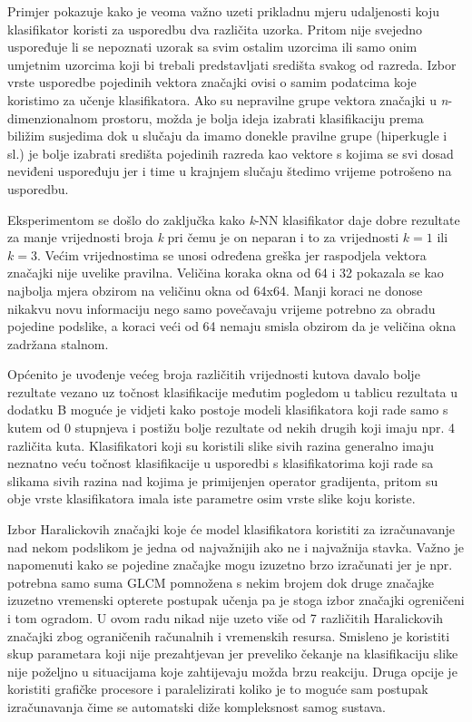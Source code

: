 \documentclass[times, utf8, zavrsni]{fer}
\begin{document}
\bigbreak

Primjer pokazuje kako je veoma važno uzeti prikladnu mjeru udaljenosti koju klasifikator koristi
za usporedbu dva različita uzorka. Pritom nije svejedno uspoređuje li se nepoznati 
uzorak sa svim ostalim uzorcima ili samo onim umjetnim uzorcima koji bi trebali
predstavljati središta svakog od razreda. Izbor vrste usporedbe pojedinih vektora
značajki ovisi o samim podatcima koje koristimo za učenje klasifikatora. Ako su nepravilne
grupe vektora značajki u \textit{n}-dimenzionalnom prostoru, možda je bolja ideja izabrati
klasifikaciju prema biližim susjedima dok u slučaju da imamo donekle pravilne grupe (hiperkugle i sl.) 
je bolje izabrati središta pojedinih razreda kao vektore s kojima se svi dosad neviđeni uspoređuju
jer i time u krajnjem slučaju štedimo vrijeme potrošeno na usporedbu. 

\bigbreak

Eksperimentom se došlo do zaključka kako \textit{k}-NN klasifikator daje dobre rezultate
za manje vrijednosti broja \textit{k} pri čemu je on neparan i to za vrijednosti \(k=1\) ili \(k=3\).
Većim vrijednostima se unosi određena greška jer raspodjela vektora značajki nije uvelike pravilna.
Veličina koraka okna od 64 i 32 pokazala se kao najbolja  mjera obzirom na veličinu okna od 64x64. 
Manji koraci ne donose nikakvu novu informaciju nego samo povečavaju vrijeme potrebno za 
obradu pojedine podslike, a koraci veći od 64 nemaju smisla obzirom da je veličina okna zadržana
stalnom. 

\bigbreak

Općenito je uvođenje većeg broja različitih vrijednosti kutova davalo bolje rezultate
vezano uz točnost klasifikacije međutim pogledom u tablicu rezultata u dodatku B moguće je 
vidjeti kako postoje modeli klasifikatora koji rade samo s kutem od 0 stupnjeva i postižu
bolje rezultate od nekih drugih koji imaju npr. 4 različita kuta. Klasifikatori koji su koristili
slike sivih razina generalno imaju neznatno veću točnost klasifikacije u usporedbi s klasifikatorima 
koji rade sa slikama sivih razina nad kojima je primijenjen operator gradijenta, pritom su obje vrste
klasifikatora imala iste parametre osim vrste slike koju koriste.

\bigbreak

Izbor Haralickovih značajki koje će model klasifikatora koristiti za izračunavanje nad nekom
podslikom je jedna od najvažnijih ako ne i najvažnija stavka. Važno je napomenuti kako se
pojedine značajke mogu izuzetno brzo izračunati jer je npr. potrebna samo suma GLCM
pomnožena s nekim brojem dok druge značajke izuzetno vremenski opterete postupak 
učenja pa je stoga izbor značajki ogreničeni i tom ogradom. U ovom radu nikad nije uzeto
više od 7 različitih Haralickovih značajki zbog ograničenih računalnih i vremenskih resursa.
Smisleno je koristiti skup parametara koji nije prezahtjevan jer preveliko čekanje na klasifikaciju
slike nije poželjno u situacijama koje zahtijevaju možda brzu reakciju. Druga opcije je 
koristiti grafičke procesore i paralelizirati koliko je to moguće sam postupak izračunavanja
čime se automatski diže kompleksnost samog sustava.
\end{document}
